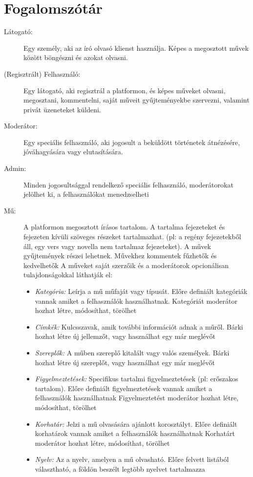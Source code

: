 \section{Fogalomszótár}

\begin{description}
\item [Látogató:] Egy személy, aki az író olvasó klienst használja. Képes a megosztott művek között böngészni és azokat olvasni.

\item [(Regisztrált) Felhasználó:] Egy látogató, aki regisztrál a platformon, és képes műveket olvasni, megosztani, kommentelni, saját műveit gyűjteményekbe szervezni, valamint privát üzeneteket küldeni.

\item [Moderátor:] Egy speciális felhasználó, aki jogosult a beküldött történetek átnézésére, jóváhagyására vagy elutasítására.

\item [Admin:] Minden jogosultsággal rendelkező speciális felhasználó, moderátorokat jelölhet ki, a felhasználókat menedzselheti

\item [Mű:] A platformon megosztott írásos tartalom. A tartalma fejezeteket és fejezeten kívüli szöveges részeket tartalmazhat. (pl: a regény fejezetekből áll, egy vers vagy novella nem tartalmaz fejezeteket).
A művek gyűjtemények részei lehetnek. Művekhez kommentek fűzhetők és kedvelhetők
A műveket saját szerzőik és a moderátorok opcionálisan tulajdonságokkal láthatják el:

\begin{itemize}
\item \emph{Kategória:} Leírja a mű műfaját vagy típusát.
Előre definiált kategóriák vannak amiket a felhasználók használhatnak.
Kategóriát moderátor hozhat létre, módosíthat, törölhet
\item \emph{Címkék:} Kulcsszavak, amik további információt adnak a műről.
Bárki hozhat létre új jellemzőt, vagy használhat egy már meglévőt
\item \emph{Szereplők:} A műben szereplő kitalált vagy valós személyek.
Bárki hozhat létre új szereplőt, vagy használhat egy már meglévőt 
\item \emph{Figyelmeztetések:} Specifikus tartalmi figyelmeztetések (pl: erőszakos tartalom).
Előre definiált figyelmeztetések vannak amiket a felhasználók használhatnak
Figyelmeztetést moderátor hozhat létre, módosíthat, törölhet
\item \emph{Korhatár:} Jelzi a mű olvasására ajánlott korosztályt.
Előre definiált korhatárok vannak amiket a felhasználók használhatnak
Korhatárt moderátor hozhat létre, módosíthat, törölhet
\item \emph{Nyelv:} Az a nyelv, amelyen a mű olvasható.
Előre felvett listából választható, a földön beszélt legtöbb nyelvet tartalmazza
\end{itemize}


\end{description}
